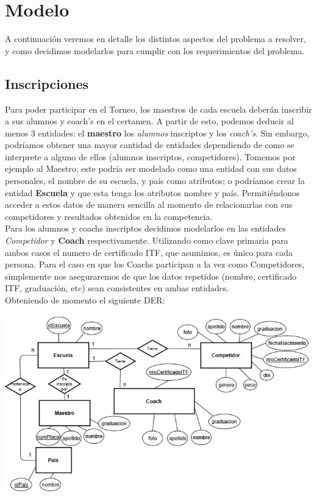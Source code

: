 \section{Modelo}

A continuación veremos en detalle los distintos aspectos del problema a resolver, y como decidimos modelarlos para cumplir con los requerimientos del problema.

\subsection{Inscripciones}

Para poder participar en el Torneo, los maestros de cada escuela deberán inscribir a sus alumnos y coach's en el certamen. A partir de esto, podemos deducir al menos 3 entidades: el \textbf{maestro} los \emph{alumnos} inscriptos y los \emph{coach's}. Sin embargo, podríamos obtener una mayor cantidad de entidades dependiendo de como se interprete a alguno de ellos (alumnos inscriptos, competidores). Tomemos por ejemplo al Maestro, este podría ser modelado como una entidad con sus datos personales, el nombre de su escuela, y país como atributos; o podríamos crear la entidad \textbf{Escuela} y que esta tenga los atributos nombre y país. Permitiéndonos acceder a estos datos de manera sencilla al momento de relacionarlas con sus competidores y resultados obtenidos en la competencia.\\

Para los alumnos y coachs inscriptos decidimos modelarlos en las entidades \emph{Competidor} y \textbf{Coach} respectivamente. Utilizando como clave primaria para ambos casos el numero de certificado ITF, que asumimos, es único para cada persona. Para el caso en que los Coachs participan a la vez como Competidores, simplemente nos aseguraremos de que los datos repetidos (nombre, certificado ITF, graduación, etc) sean consistentes en ambas entidades.\\

Obteniendo de momento el siguiente DER:

\includegraphics[scale=0.75]{inscripcion.jpg}

